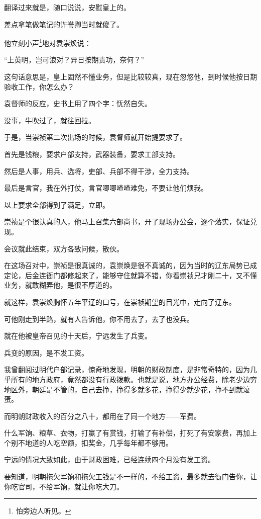 \begin{multicols}{\theparacolNo}
		翻译过来就是，随口说说，安慰皇上的。

		差点拿笔做笔记的许誉卿当时就傻了。

		他立刻小声\footnote{怕旁边人听见。}地对袁崇焕说：

		“上英明，岂可浪对？异日按期责功，奈何？”

		这句话意思是，皇上固然不懂业务，但是比较较真，现在忽悠他，到时候他按日期验收工作，你怎么办？

		袁督师的反应，史书上用了四个字：怃然自失。

		没事，牛吹过了，就往回拉。

		于是，当崇祯第二次出场的时候，袁督师就开始提要求了。

		首先是钱粮，要求户部支持，武器装备，要求工部支持。

		然后是人事，用兵、选将，吏部、兵部不得干涉，全力支持。

		最后是言官，我在外打仗，言官唧唧喳喳难免，不要让他们烦我。

		以上要求全部得到了满足，立即。

		崇祯是个很认真的人，他马上召集六部尚书，开了现场办公会，逐个落实，保证兑现。

		会议就此结束，双方各致问候，散伙。

		在这场召对中，崇祯是很真诚的，袁崇焕是很不真诚的，因为当时的辽东局势已成定论，后金连衙门都修起来了，能够守住就算不错，你看崇祯兄才刚二十，又不懂业务，就敢糊弄他，是很不厚道的。

		就这样，袁崇焕胸怀五年平辽的口号，在崇祯期望的目光中，走向了辽东。

		可他刚走到半路，就有人告诉他，你不用去了，去了也没兵。

		就在他被皇帝召见的十天后，宁远发生了兵变。

		兵变的原因，是不发工资。

		我曾翻阅过明代户部记录，惊奇地发现，明朝的财政制度，是非常奇特的，因为几乎所有的地方政府，竟然都没有行政拨款。也就是说，地方办公经费，除老少边穷地区外，朝廷是不管的，自己去挣，挣得多就多花，挣得少就少花，挣不到就滚蛋。

		而明朝财政收入的百分之八十，都用在了同一个地方——军费。

		什么军饷、粮草、衣物，打赢了有赏钱，打输了有补偿，打死了有安家费，再加上个别不地道的人吃空额，扣奖金，几乎每年都不够用。

		宁远的情况大致如此，由于财政困难，已经连续四个月没有发工资。

		要知道，明朝拖欠军饷和拖欠工钱是不一样的，不给工资，最多就去衙门告你，让你吃官司，不给军饷，就让你吃大刀。


\end{multicols}
